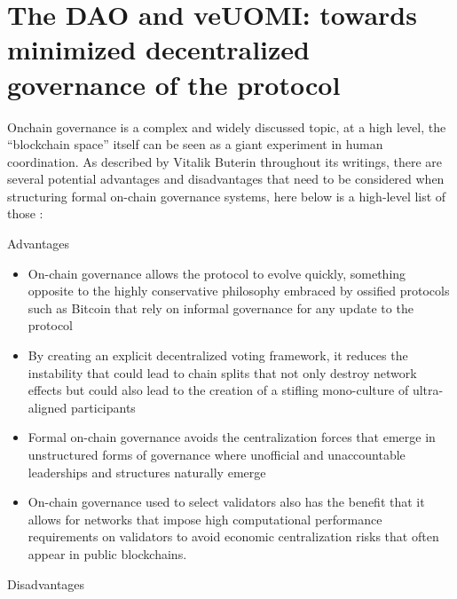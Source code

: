 \documentclass{article}
\begin{document}
\section{The DAO and veUOMI:  towards minimized decentralized governance of the protocol
}

Onchain governance is a complex and widely discussed topic, at a high level, the “blockchain space” itself can be seen as a giant experiment in human coordination. As described by Vitalik Buterin throughout its writings, there are several potential advantages and disadvantages that need to be considered when structuring formal on-chain governance systems, here below is a high-level list of those :

Advantages 

\begin{itemize}

\item On-chain governance allows the protocol to evolve quickly, something opposite to the highly conservative philosophy embraced by ossified protocols such as Bitcoin that rely on informal governance for any update to the protocol

\item By creating an explicit decentralized voting framework, it reduces the instability that could lead to chain splits that not only destroy network effects but could  also lead to the creation of a stifling mono-culture of ultra-aligned participants 

\item Formal on-chain governance avoids the centralization forces that emerge in  unstructured forms of governance where unofficial and unaccountable leaderships and structures naturally emerge

\item On-chain governance used to select validators also has the benefit that it allows for networks that impose high computational performance requirements on validators to avoid economic centralization risks that often appear in public blockchains.

\end{itemize}

Disadvantages
\end{document}
